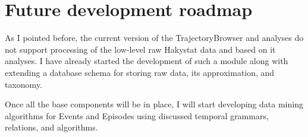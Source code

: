 \section{Future development roadmap}
As I pointed before, the current version of the TrajectoryBrowser and analyses do not support processing of the low-level raw Hakystat data and based on it analyses. I have already started the development of such a module along with extending a database schema for storing raw data, its approximation, and taxonomy.

Once all the base components will be in place, I will start developing data mining algorithms for Events and Episodes using discussed temporal grammars, relations, and algorithms.